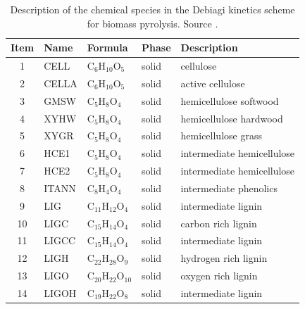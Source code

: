 \begin{center}
    \footnotesize
    \begin{longtable}{cllll}
        \caption{Description of the chemical species in the Debiagi kinetics scheme for biomass pyrolysis. Source \cite{Debiagi-2018}.}
        \label{tab:chem-species} \\
        \toprule
        Item & Name & Formula & Phase & Description \\
        \midrule
        1  & CELL           & C$_6$H$_{10}$O$_5$      & \cellcolor{green!25}solid        & cellulose \\
        2  & CELLA          & C$_6$H$_{10}$O$_5$      & \cellcolor{green!25}solid        & active cellulose \\
        3  & GMSW           & C$_5$H$_{8}$O$_4$       & \cellcolor{green!25}solid        & hemicellulose softwood \\
        4  & XYHW           & C$_5$H$_{8}$O$_4$       & \cellcolor{green!25}solid        & hemicellulose hardwood \\
        5  & XYGR           & C$_5$H$_{8}$O$_4$       & \cellcolor{green!25}solid        & hemicellulose grass \\
        6  & HCE1           & C$_5$H$_{8}$O$_4$       & \cellcolor{green!25}solid        & intermediate hemicellulose \\
        7  & HCE2           & C$_5$H$_{8}$O$_4$       & \cellcolor{green!25}solid        & intermediate hemicellulose \\
        8  & ITANN          & C$_8$H$_{4}$O$_4$       & \cellcolor{green!25}solid        & intermediate phenolics \\
        9  & LIG            & C$_{11}$H$_{12}$O$_4$   & \cellcolor{green!25}solid        & intermediate lignin \\
        10 & LIGC           & C$_{15}$H$_{14}$O$_4$   & \cellcolor{green!25}solid        & carbon rich lignin \\
        11 & LIGCC          & C$_{15}$H$_{14}$O$_4$   & \cellcolor{green!25}solid        & intermediate lignin \\
        12 & LIGH           & C$_{22}$H$_{28}$O$_9$   & \cellcolor{green!25}solid        & hydrogen rich lignin \\
        13 & LIGO           & C$_{20}$H$_{22}$O$_{10}$& \cellcolor{green!25}solid        & oxygen rich lignin \\
        14 & LIGOH          & C$_{19}$H$_{22}$O$_8$   & \cellcolor{green!25}solid        & intermediate lignin \\

\end{longtable}
\end{center}
